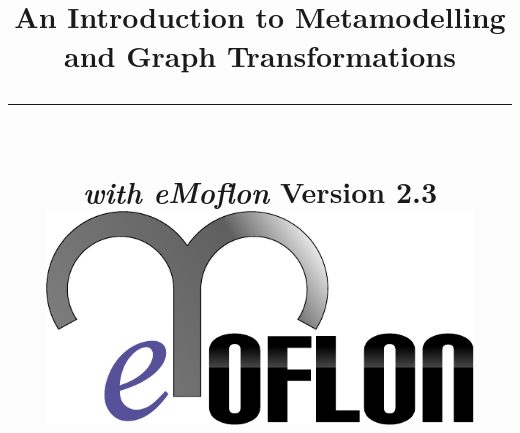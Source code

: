 \title{
\flushright
{\LARGE\bfseries An Introduction to Metamodelling\\
and Graph Transformations}
\noindent\rule[-1ex]{\textwidth}{5pt}\\[2.5ex]
\hfill\emph{\LARGE\bfseries with eMoflon}
\flushleft
{\small Version 2.3}
\flushright
\includegraphics[width=0.85\textwidth]{pics/eMoflon3} 
}

\date{}  
\author{} 
